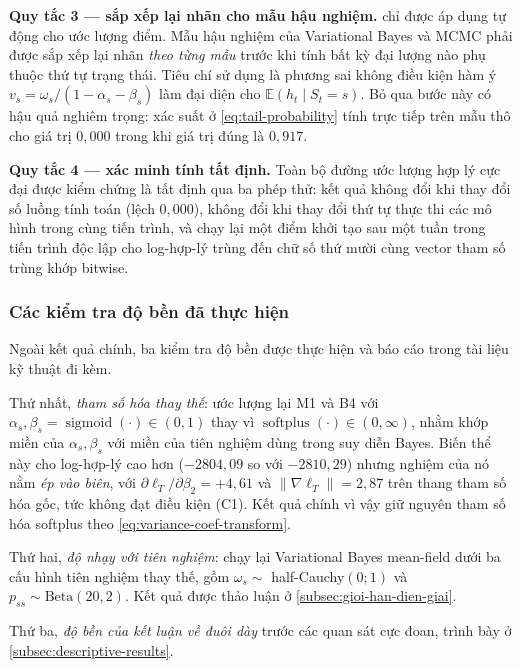 \documentclass[12pt,a4paper]{article}
\numberwithin{equation}{section}
\newcommand{\E}{\mathbb{E}}
\begin{document}
\textbf{Quy tắc 3 --- sắp xếp lại nhãn cho mẫu hậu nghiệm.}  chỉ được áp dụng tự động cho ước lượng điểm. Mẫu hậu nghiệm của Variational Bayes và MCMC phải được sắp xếp lại nhãn \emph{theo từng mẫu} trước khi tính bất kỳ đại lượng nào phụ thuộc thứ tự trạng thái. Tiêu chí sử dụng là phương sai không điều kiện hàm ý $v_s = \omega_s/(1-\alpha_s-\beta_s)$ làm đại diện cho $\E(h_t\mid S_t=s)$. Bỏ qua bước này có hậu quả nghiêm trọng: xác suất ở \cref{eq:tail-probability} tính trực tiếp trên mẫu thô cho giá trị $0{,}000$ trong khi giá trị đúng là $0{,}917$.

\textbf{Quy tắc 4 --- xác minh tính tất định.} Toàn bộ đường ước lượng hợp lý cực đại được kiểm chứng là tất định qua ba phép thử: kết quả không đổi khi thay đổi số luồng tính toán (lệch $0{,}000$), không đổi khi thay đổi thứ tự thực thi các mô hình trong cùng tiến trình, và chạy lại một điểm khởi tạo sau một tuần trong tiến trình độc lập cho log-hợp-lý trùng đến chữ số thứ mười cùng vector tham số trùng khớp bitwise.

\subsubsection*{Các kiểm tra độ bền đã thực hiện}

Ngoài kết quả chính, ba kiểm tra độ bền được thực hiện và báo cáo trong tài liệu kỹ thuật đi kèm.

Thứ nhất, \emph{tham số hóa thay thế}: ước lượng lại M1 và B4 với $\alpha_s,\beta_s = \operatorname{sigmoid}(\cdot)\in(0,1)$ thay vì $\operatorname{softplus}(\cdot)\in(0,\infty)$, nhằm khớp miền của $\alpha_s,\beta_s$ với miền của tiên nghiệm dùng trong suy diễn Bayes. Biến thể này cho log-hợp-lý cao hơn ($-2804{,}09$ so với $-2810{,}29$) nhưng nghiệm của nó nằm \emph{ép vào biên}, với $\partial\ell_T/\partial\beta_2 = +4{,}61$ và $\lVert\nabla\ell_T\rVert = 2{,}87$ trên thang tham số hóa gốc, tức không đạt điều kiện (C1). Kết quả chính vì vậy giữ nguyên tham số hóa softplus theo \cref{eq:variance-coef-transform}.

Thứ hai, \emph{độ nhạy với tiên nghiệm}: chạy lại Variational Bayes mean-field dưới ba cấu hình tiên nghiệm thay thế, gồm $\omega_s\sim$ half-Cauchy$(0;1)$ và $p_{ss}\sim\mathrm{Beta}(20,2)$. Kết quả được thảo luận ở \cref{subsec:gioi-han-dien-giai}.

Thứ ba, \emph{độ bền của kết luận về đuôi dày} trước các quan sát cực đoan, trình bày ở \cref{subsec:descriptive-results}.
\end{document}
